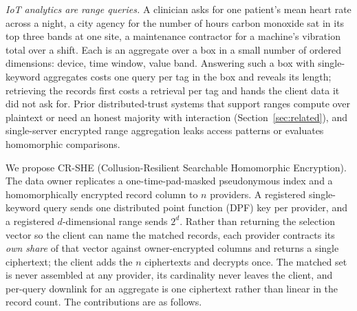 \documentclass[a4paper,fleqn]{cas-sc}
\begin{document}
\emph{IoT analytics are range queries.} A clinician asks for one patient's
mean heart rate across a night, a city agency for the number of hours carbon
monoxide sat in its top three bands at one site, a maintenance contractor for a
machine's vibration total over a shift. Each is an aggregate over a box in a
small number of ordered dimensions: device, time window, value band. Answering
such a box with single-keyword aggregates costs one query per tag in the box
and reveals its length; retrieving the records first costs a retrieval per tag
and hands the client data it did not ask for. Prior distributed-trust systems
that support ranges compute over plaintext or need an honest majority with
interaction (Section~\ref{sec:related}), and single-server encrypted range
aggregation leaks access patterns or evaluates homomorphic comparisons.

We propose CR-SHE (Collusion-Resilient Searchable Homomorphic Encryption). The
data owner replicates a one-time-pad-masked pseudonymous index and a
homomorphically encrypted record column to $n$ providers. A registered
single-keyword query sends one distributed point function (DPF) key per
provider, and a registered $d$-dimensional range sends $2^d$. Rather than
returning the selection vector so the client can name the matched records, each
provider contracts its \emph{own share} of that vector against owner-encrypted
columns and returns a single ciphertext; the client adds the $n$ ciphertexts
and decrypts once. The matched set is never assembled at any provider, its cardinality
never leaves the client, and per-query downlink for an aggregate is one
ciphertext rather than linear in the record count. The contributions are as
follows.
\end{document}
